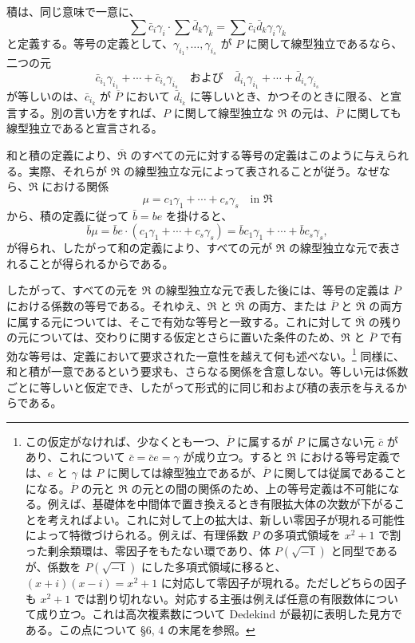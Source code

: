 \documentclass[11pt]{article}
\begin{document}
積は、同じ意味で一意に、
\[
  \sum \bar c_i\gamma_i\cdot \sum \bar d_k\gamma_k
  =\sum \bar c_i\bar d_k\gamma_i\gamma_k
\]
と定義する。等号の定義として、$\gamma_{i_1},\ldots,\gamma_{i_s}$ が $P$ に関して線型独立であるなら、二つの元
\[
   \bar c_{i_1}\gamma_{i_1}+\cdots+\bar c_{i_s}\gamma_{i_s}
   \quad\text{および}\quad
   \bar d_{i_1}\gamma_{i_1}+\cdots+\bar d_{i_s}\gamma_{i_s}
\]
が等しいのは、$\bar c_{i_k}$ が $\overline P$ において $\bar d_{i_k}$ に等しいとき、かつそのときに限る、と宣言する。別の言い方をすれば、$P$ に関して線型独立な $\mathfrak R$ の元は、$\overline P$ に関しても線型独立であると宣言される。

和と積の定義により、$\overline{\mathfrak R}$ のすべての元に対する等号の定義はこのように与えられる。実際、それらが $\mathfrak R$ の線型独立な元によって表されることが従う。なぜなら、$\mathfrak R$ における関係
\[
  \mu=c_1\gamma_1+\cdots+c_s\gamma_s\quad\text{in }\mathfrak R
\]
から、積の定義に従って $\bar b=be$ を掛けると、
\[
  \bar b\mu=\bar b e\cdot(c_1\gamma_1+\cdots+c_s\gamma_s)
  =\bar b c_1\gamma_1+\cdots+\bar b c_s\gamma_s,
\]
が得られ、したがって和の定義により、すべての元が $\mathfrak R$ の線型独立な元で表されることが得られるからである。

したがって、すべての元を $\mathfrak R$ の線型独立な元で表した後には、等号の定義は $\overline P$ における係数の等号である。それゆえ、$\mathfrak R$ と $\overline{\mathfrak R}$ の両方、または $\overline P$ と $\overline{\mathfrak R}$ の両方に属する元については、そこで有効な等号と一致する。これに対して $\overline{\mathfrak R}$ の残りの元については、交わりに関する仮定とさらに置いた条件のため、$\mathfrak R$ と $\overline P$ で有効な等号は、定義において要求された一意性を越えて何も述べない。\footnote{この仮定がなければ、少なくとも一つ、$\overline P$ に属するが $P$ に属さない元 $\bar c$ があり、これについて $\bar c=\bar c e=\gamma$ が成り立つ。すると $\mathfrak R$ における等号定義では、$e$ と $\gamma$ は $P$ に関しては線型独立であるが、$\overline P$ に関しては従属であることになる。$\overline P$ の元と $\mathfrak R$ の元との間の関係のため、上の等号定義は不可能になる。例えば、基礎体を中間体で置き換えるとき有限拡大体の次数が下がることを考えればよい。これに対して上の拡大は、新しい零因子が現れる可能性によって特徴づけられる。例えば、有理係数 $P$ の多項式領域を $x^2+1$ で割った剰余類環は、零因子をもたない環であり、体 $P(\sqrt{-1})$ と同型であるが、係数を $P(\sqrt{-1})$ にした多項式領域に移ると、$(x+i)(x-i)=x^2+1$ に対応して零因子が現れる。ただしどちらの因子も $x^2+1$ では割り切れない。対応する主張は例えば任意の有限数体について成り立つ。これは高次複素数について Dedekind が最初に表明した見方である。この点について \S 6, 4 の末尾を参照。} 同様に、和と積が一意であるという要求も、さらなる関係を含意しない。等しい元は係数ごとに等しいと仮定でき、したがって形式的に同じ和および積の表示を与えるからである。
\end{document}
